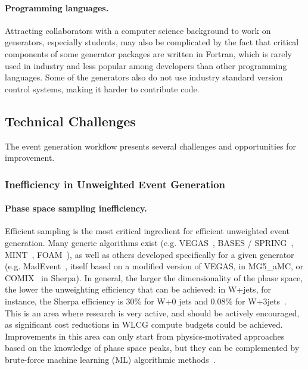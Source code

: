 \paragraph{Programming languages.} Attracting collaborators with a computer
science background to work on generators, especially students, may also
be complicated by the fact that critical components of some generator
packages are written in Fortran, which is rarely used in industry and
less popular among developers than other programming languages. Some of
the generators also do not use industry standard version control
systems, making it harder to contribute code.

\hypertarget{technical-challenges-software-and-computing}{%
\subsection{Technical Challenges}\label{technical-challenges-software-and-computing}}

The event generation workflow presents several challenges and
opportunities for improvement.

\subsubsection{Inefficiency in Unweighted Event Generation}

\paragraph{Phase space sampling inefficiency.} Efficient sampling is the most
critical ingredient for efficient unweighted event generation. Many
generic algorithms exist (e.g. VEGAS~\cite{Lep80}, BASES / SPRING~\cite{Kaw86}, 
MINT~\cite{Nas07}, FOAM~\cite{Jad03}), as well as others
developed specifically for a given generator (e.g. MadEvent~\cite{Mal03},
itself based on a modified version of VEGAS, in MG5\_aMC, or COMIX~\cite{Gle08} 
in Sherpa). In general, the larger the dimensionality of the
phase space, the lower the unweighting efficiency that can be achieved:
in W+jets, for instance, the Sherpa efficiency is 30\% for W+0 jets and
0.08\% for W+3jets~\cite{Gao20}. This is an area where research is very
active, and should be actively encouraged, as significant cost
reductions in WLCG compute budgets could be achieved. Improvements in
this area can only start from physics-motivated approaches based on the
knowledge of phase space peaks, but they can be complemented by
brute-force machine learning (ML) algorithmic methods~\cite{Ben17,Bot20,Gao20,Kli18}.

